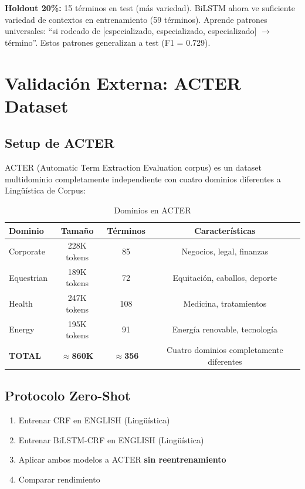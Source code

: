 \textbf{Holdout 20\%:} 15 términos en test (más variedad). BiLSTM ahora ve suficiente variedad de contextos en entrenamiento (59 términos). Aprende patrones universales: ``si rodeado de [especializado, especializado, especializado] $\rightarrow$ término''. Estos patrones generalizan a test (F1 = 0.729).

\section{Validación Externa: ACTER Dataset}

\subsection{Setup de ACTER}

ACTER (Automatic Term Extraction Evaluation corpus) es un dataset multidominio completamente independiente con cuatro dominios diferentes a Lingüística de Corpus:

\begin{table}[H]
\centering
\caption{Dominios en ACTER}
\label{tab:acter_domains}
\begin{tabular}{lccc}
\toprule
\textbf{Dominio} & \textbf{Tamaño} & \textbf{Términos} & \textbf{Características} \\
\midrule
Corporate & 228K tokens & 85 & Negocios, legal, finanzas \\
Equestrian & 189K tokens & 72 & Equitación, caballos, deporte \\
Health & 247K tokens & 108 & Medicina, tratamientos \\
Energy & 195K tokens & 91 & Energía renovable, tecnología \\
\midrule
\textbf{TOTAL} & \textbf{$\approx$860K} & \textbf{$\approx$356} & Cuatro dominios completamente diferentes \\
\bottomrule
\end{tabular}
\end{table}

\subsection{Protocolo Zero-Shot}

\begin{enumerate}
    \item Entrenar CRF en ENGLISH (Lingüística)
    \item Entrenar BiLSTM-CRF en ENGLISH (Lingüística)
    \item Aplicar ambos modelos a ACTER \textbf{sin reentrenamiento}
    \item Comparar rendimiento
\end{enumerate}

